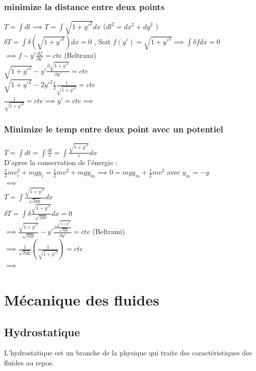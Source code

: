 \documentclass[12pt,oneside]{book}
\begin{document}
\subsection{minimize la distance entre deux points }
\begin{small}
$ T = \int dl \implies T = \int \sqrt{1+y'^2}dx $ ($  dl^2 = dx^2 + dy^2 $ )\\
$ \delta T = \int \delta (\sqrt{1+y'^2})dx = 0 $ , Soit $ f(y') = \sqrt{1+y'^2} \implies \int\delta f dx =0 $ \\
$ \implies f -y' \frac{df}{\partial y'} = cte $ (Beltrami) \\
$ \sqrt{1+y'^2} - y' \frac{\partial\sqrt{1 + y'^2}}{\partial y'} = cte  $\\
$ \sqrt{1 + y'^2} -2y'^2\frac{1}{2}\frac{1}{\sqrt{1+y'^2}} = cte  $\\
$ \frac{1}{\sqrt{1+y'^2}} = cte \implies y' =cte \implies  $ 
\end{small}
\subsection{Minimize le temp entre deux point avec un potentiel}
\begin{small}
$ T = \int dt = \int\frac{dl}{v} = \int\frac{\sqrt{1+y'^2}}{v}dx $\\
D'apres la conservation de l'énergie : $ \frac{1}{2}mv_i^2 + mgy_i = \frac{1}{2}mv^2 + mgy_m \implies 0 = mgy_m +\frac{1}{2}mv^2  $ avec $ y_m = - y $ \\
$ \implies  $ \\
$ T = \int \frac{\sqrt{1+y'^2}}{\sqrt{2gy}}dx $ \\
$ \delta T = \int \delta \frac{\sqrt{1+y'^2}}{\sqrt{2gy}}dx  = 0 $\\
$ \implies \frac{\sqrt{1+y'^2}}{\sqrt{2gy}} - y' \frac{\partial \frac{\sqrt{1+y'^2}}{\sqrt{2gy}}}{\partial y'} = cte $ (Beltrami) \\
$ \implies \frac{1}{\sqrt{2gy}}(\frac{1}{\sqrt{1+y'^2}}) =cte  $\\
$ \implies $ 
\end{small}
\chapter{Mécanique des fluides }
\section{Hydrostatique}
L'hydrostatique est un branche de la physique qui traite des caractéristiques des fluides au repos.
\end{document}
